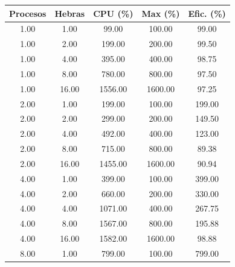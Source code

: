 \begin{table}[ht]
    \centering
    \begin{tabular}{|c|c|c|c|c|}
        \hline
        \textbf{Procesos} & \textbf{Hebras} & \textbf{CPU (\%)} & \textbf{Max (\%)} & \textbf{Efic. (\%)} \\
        \hline
        1.00              & 1.00            & 99.00             & 100.00            & 99.00               \\
        1.00              & 2.00            & 199.00            & 200.00            & 99.50               \\
        1.00              & 4.00            & 395.00            & 400.00            & 98.75               \\
        1.00              & 8.00            & 780.00            & 800.00            & 97.50               \\
        1.00              & 16.00           & 1556.00           & 1600.00           & 97.25               \\
        2.00              & 1.00            & 199.00            & 100.00            & 199.00              \\
        2.00              & 2.00            & 299.00            & 200.00            & 149.50              \\
        2.00              & 4.00            & 492.00            & 400.00            & 123.00              \\
        2.00              & 8.00            & 715.00            & 800.00            & 89.38               \\
        2.00              & 16.00           & 1455.00           & 1600.00           & 90.94               \\
        4.00              & 1.00            & 399.00            & 100.00            & 399.00              \\
        4.00              & 2.00            & 660.00            & 200.00            & 330.00              \\
        4.00              & 4.00            & 1071.00           & 400.00            & 267.75              \\
        4.00              & 8.00            & 1567.00           & 800.00            & 195.88              \\
        4.00              & 16.00           & 1582.00           & 1600.00           & 98.88               \\
        8.00              & 1.00            & 799.00            & 100.00            & 799.00              \\

\end{tabular}
\end{table}
